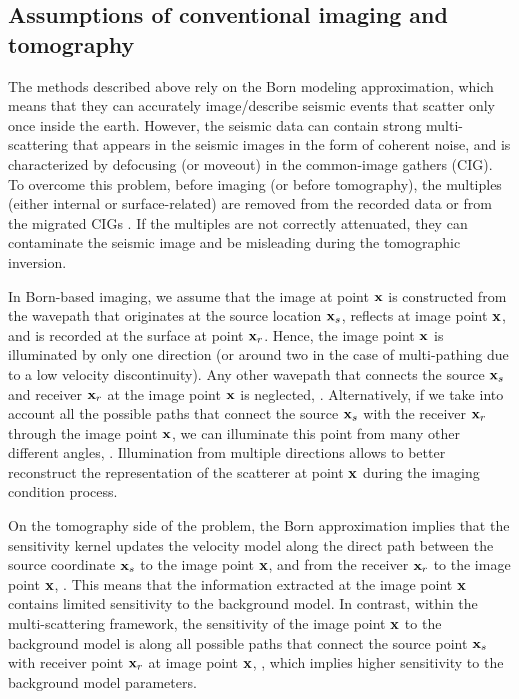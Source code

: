 \subsection{Assumptions of conventional imaging and tomography}
The methods described above rely on the Born modeling approximation, which means that 
they can accurately image/describe seismic events that scatter only once inside the earth. However,
 the seismic data can contain strong multi-scattering  that appears in the seismic images 
in the form of coherent noise, and is characterized by defocusing (or moveout) in the common-image gathers (CIG). 
 To overcome this problem, before imaging (or before tomography), the multiples (either internal
or surface-related) are removed from the recorded data \citep{SRME,ArtWeiglein,guitton2005,Herrmann} or from the 
migrated CIGs \citep{SavaGuitton,Wang,Weibull}. If the multiples are not correctly attenuated, 
they can contaminate the seismic image and be misleading during the tomographic inversion. 

In Born-based imaging, we assume that the image at point ${\bf x}$ is constructed from the 
wavepath that originates at the source location ${\bf x}_s$, reflects at image point ${\bf x}$, and is recorded
at the surface at point ${\bf x}_r$. Hence, the image point ${\bf x}$ is illuminated by only 
one direction (or around two in the case of multi-pathing due to a low velocity discontinuity). 
 Any other wavepath that connects the source ${\bf x}_s$ and receiver ${\bf x}_r$ at
the image point ${\bf x}$ is neglected, . Alternatively, if we take into account
all the possible paths that connect the source ${\bf x}_s$ with the receiver ${\bf x}_r$ through the image point ${\bf x}$,
 we can illuminate this point from many other different angles, . Illumination from 
multiple directions allows to better reconstruct the 
representation of the scatterer at point ${\bf x}$ during the imaging condition process. 

On the tomography side of the problem, the Born approximation implies that the sensitivity 
kernel updates the velocity model along the direct path between the source coordinate ${\bf x}_s$ to 
the image point ${\bf x}$, and from the receiver  ${\bf x}_r$ to the image point ${\bf x}$, . This means
that the information extracted at the image point ${\bf x}$ contains limited sensitivity to
the background model. In contrast, within the multi-scattering framework, the sensitivity of the 
image point ${\bf x}$ to the background model is along all possible paths that connect
the source point ${\bf x}_s$ with receiver point ${\bf x}_r$ at image point ${\bf x}$, ,
 which implies higher sensitivity to the background model parameters. 

